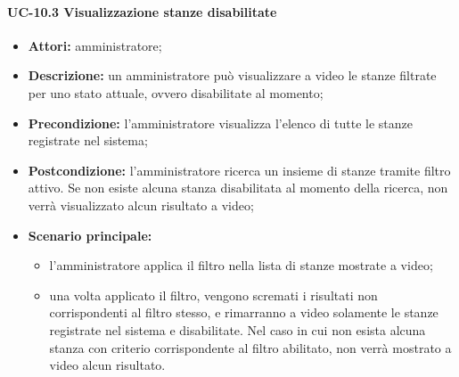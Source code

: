 \paragraph{UC-10.3 Visualizzazione stanze disabilitate}
\begin{itemize}
    \item \textbf{Attori:} amministratore;
    \item \textbf{Descrizione:} un amministratore pu\`{o} visualizzare a video le stanze filtrate per uno stato attuale, ovvero disabilitate al momento;
    \item \textbf{Precondizione:} l'amministratore visualizza l'elenco di tutte le stanze registrate nel sistema;
    \item \textbf{Postcondizione:} l'amministratore ricerca un insieme di stanze tramite filtro attivo. Se non esiste alcuna stanza disabilitata al momento della ricerca, non verrà visualizzato alcun risultato a video;
    \item \textbf{Scenario principale:}
    \begin{itemize}
        \item l'amministratore applica il filtro nella lista di stanze mostrate a video;
        \item una volta applicato il filtro, vengono scremati i risultati non corrispondenti al filtro stesso, e rimarranno a video solamente le stanze registrate nel sistema e disabilitate. Nel caso in cui non esista alcuna stanza con criterio corrispondente al filtro abilitato, non verrà mostrato a video alcun risultato.
    \end{itemize}
\end{itemize}



